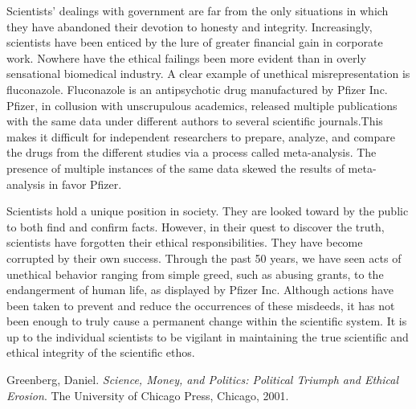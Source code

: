 \documentclass{article}[12pt]
\begin{document}
Scientists' dealings with government are far from the only situations in which
they have abandoned their devotion to honesty and integrity.  Increasingly,
scientists have been enticed by the lure of greater financial gain in corporate
work. Nowhere have the ethical failings been more evident than in overly
sensational biomedical industry. A clear example of unethical misrepresentation
is fluconazole.  Fluconazole is an antipsychotic drug manufactured by Pfizer
Inc.  Pfizer, in collusion with unscrupulous academics, released multiple
publications with the same data under different authors to several scientific
journals.This makes it difficult for independent researchers to prepare,
analyze, and compare the drugs from  the different studies via a process called
meta-analysis. The presence of multiple instances of the same data skewed the
results of meta-analysis in favor Pfizer.

Scientists hold a unique position in society. They are looked toward by the
public to both find and confirm facts. However, in their quest to discover the
truth, scientists have forgotten their ethical responsibilities.  They have
become corrupted by their own success.  Through the past 50 years, we have seen
acts of unethical behavior ranging from simple greed, such as abusing grants,
to the endangerment of human life, as displayed by Pfizer Inc.  Although
actions have been taken to prevent and reduce the occurrences of these
misdeeds, it has not been enough to truly cause a permanent change within the
scientific system. It is up to the individual scientists to be vigilant in
maintaining the true scientific and ethical integrity of the scientific ethos.

\theendnotes

\begin{thebibliography}{9}

  Greenberg, Daniel.
  \emph{Science, Money, and Politics: Political Triumph and Ethical Erosion}.
  The University of Chicago Press, Chicago,
  2001.

\end{thebibliography}
\end{document}
